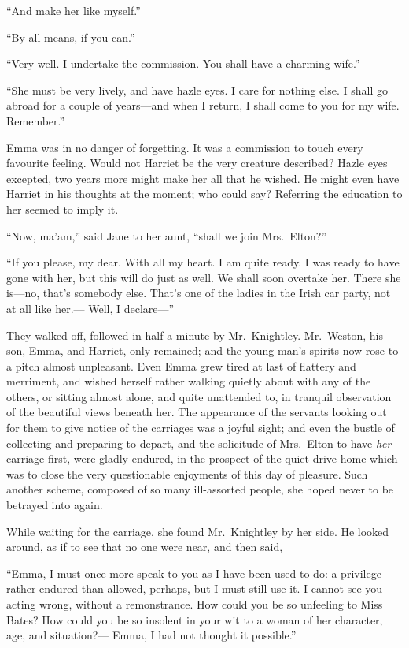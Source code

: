 ``And make her like myself.''

``By all means, if you can.''

``Very well.  I undertake the commission.  You shall have a charming wife.''

``She must be very lively, and have hazle eyes.  I care for nothing else.
I shall go abroad for a couple of years---and when I return,
I shall come to you for my wife.  Remember.''

Emma was in no danger of forgetting.  It was a commission to touch every
favourite feeling.  Would not Harriet be the very creature described?
Hazle eyes excepted, two years more might make her all that he wished.
He might even have Harriet in his thoughts at the moment;
who could say?  Referring the education to her seemed to imply it.

``Now, ma'am,'' said Jane to her aunt, ``shall we join Mrs.\ Elton?''

``If you please, my dear.  With all my heart.  I am quite ready.
I was ready to have gone with her, but this will do just as well.
We shall soon overtake her.  There she is---no, that's somebody else.
That's one of the ladies in the Irish car party, not at all like her.---%
Well, I declare---''

They walked off, followed in half a minute by Mr.\ Knightley.
Mr.\ Weston, his son, Emma, and Harriet, only remained; and the young
man's spirits now rose to a pitch almost unpleasant.  Even Emma grew
tired at last of flattery and merriment, and wished herself rather
walking quietly about with any of the others, or sitting almost alone,
and quite unattended to, in tranquil observation of the beautiful
views beneath her.  The appearance of the servants looking out
for them to give notice of the carriages was a joyful sight;
and even the bustle of collecting and preparing to depart,
and the solicitude of Mrs.\ Elton to have \emph{her} carriage first,
were gladly endured, in the prospect of the quiet drive home which was
to close the very questionable enjoyments of this day of pleasure.
Such another scheme, composed of so many ill-assorted people,
she hoped never to be betrayed into again.

While waiting for the carriage, she found Mr.\ Knightley by her side.
He looked around, as if to see that no one were near, and then said,

``Emma, I must once more speak to you as I have been used to do:
a privilege rather endured than allowed, perhaps, but I must still
use it.  I cannot see you acting wrong, without a remonstrance.
How could you be so unfeeling to Miss Bates?  How could you be so
insolent in your wit to a woman of her character, age, and situation?---%
Emma, I had not thought it possible.''

